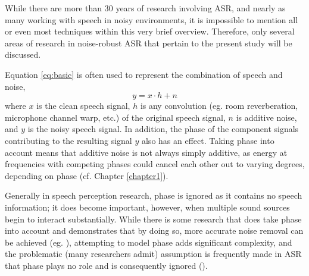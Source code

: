 While there are more than 30 years of research involving ASR, and nearly as many working with speech in noisy environments, it is impossible to mention all or even most techniques within this very brief overview.  Therefore, %
 only several areas of research in noise-robust ASR that pertain to the present study will be discussed.

Equation \ref{eq:basic} is often used to represent the combination of speech and noise,
\begin{equation}\label{eq:basic}
y = x \cdot h + n
\end{equation}
where $x$ is the clean speech signal, $h$ is any convolution (eg. room reverberation, microphone channel warp, etc.) of the original speech signal, $n$ is additive noise, and $y$ is the noisy speech signal.  In addition, the phase of the component signals contributing to the resulting signal $y$ also has an effect.  Taking phase into account means that additive noise is not always simply additive, as energy at frequencies with competing phases could cancel each other out to varying degrees, depending on phase (cf. Chapter \ref{chapter1}).  

Generally in speech perception research, phase is ignored as it contains no speech information; it does become important, however, when multiple sound sources begin to interact substantially. While there is some research that does take phase into account and demonstrates that by doing so, more accurate noise removal can be achieved (eg. \cite{deng:04,leutnant:09}), attempting to model phase adds significant complexity, and the problematic (many researchers admit) assumption is frequently made in ASR that phase plays no role and is consequently ignored (\cite{li:14}).  


